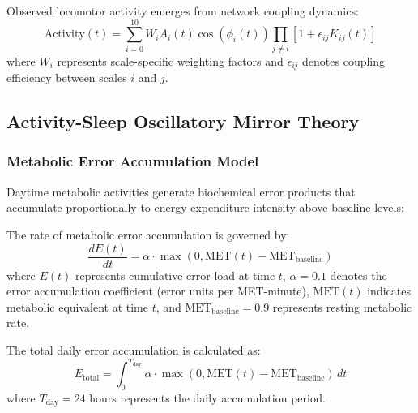 \begin{definition}
Observed locomotor activity emerges from network coupling dynamics:
\begin{equation}
\text{Activity}(t) = \sum_{i=0}^{10} W_i A_i(t) \cos(\phi_i(t)) \prod_{j \neq i} [1 + \epsilon_{ij} K_{ij}(t)]
\label{eq:activity_output}
\end{equation}
where $W_i$ represents scale-specific weighting factors and $\epsilon_{ij}$ denotes coupling efficiency between scales $i$ and $j$.
\end{definition}

\subsection{Activity-Sleep Oscillatory Mirror Theory}

\subsubsection{Metabolic Error Accumulation Model}

Daytime metabolic activities generate biochemical error products that accumulate proportionally to energy expenditure intensity above baseline levels:

\begin{definition}
The rate of metabolic error accumulation is governed by:
\begin{equation}
\frac{dE(t)}{dt} = \alpha \cdot \max(0, \text{MET}(t) - \text{MET}_{\text{baseline}})
\label{eq:error_rate}
\end{equation}
where $E(t)$ represents cumulative error load at time $t$, $\alpha = 0.1$ denotes the error accumulation coefficient (error units per MET-minute), $\text{MET}(t)$ indicates metabolic equivalent at time $t$, and $\text{MET}_{\text{baseline}} = 0.9$ represents resting metabolic rate.
\end{definition}

\begin{definition}
The total daily error accumulation is calculated as:
\begin{equation}
E_{\text{total}} = \int_0^{T_{\text{day}}} \alpha \cdot \max(0, \text{MET}(t) - \text{MET}_{\text{baseline}}) \, dt
\label{eq:total_error}
\end{equation}
where $T_{\text{day}} = 24$ hours represents the daily accumulation period.
\end{definition}

